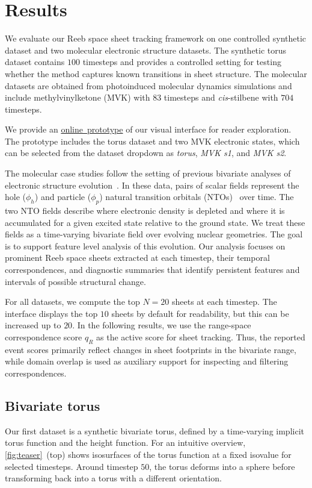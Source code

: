\documentclass[review]{vgtc}                          %
\begin{document}
\section{Results}

We evaluate our Reeb space sheet tracking framework on one controlled synthetic dataset and two molecular electronic structure datasets. The synthetic torus dataset contains $100$ timesteps and provides a controlled setting for testing whether the method captures known transitions in sheet structure. The molecular datasets are obtained from photoinduced molecular dynamics simulations and include methylvinylketone (MVK) with $83$ timesteps and \textit{cis}-stilbene with $704$ timesteps.

We provide an \mbox{\href{https://reebflowvisualizer.github.io}{online prototype}} of our visual interface for reader exploration. The prototype includes the torus dataset and two MVK electronic states, which can be selected from the dataset dropdown as \emph{torus}, \emph{MVK s1}, and \emph{MVK s2}.

The molecular case studies follow the setting of previous bivariate analyses of electronic structure evolution~\cite{Sharma2025}. In these data, pairs of scalar fields represent the hole ($\phi_h$) and particle ($\phi_p$) natural transition orbitals (NTOs)~\cite{martin_nto_2023} over time. The two NTO fields describe where electronic density is depleted and where it is accumulated for a given excited state relative to the ground state. We treat these fields as a time-varying bivariate field over evolving nuclear geometries. The goal is to support feature level analysis of this evolution. Our analysis focuses on prominent Reeb space sheets extracted at each timestep, their temporal correspondences, and diagnostic summaries that identify persistent features and intervals of possible structural change.

For all datasets, we compute the top $N=20$ sheets at each timestep. The interface displays the top $10$ sheets by default for readability, but this can be increased up to $20$. In the following results, we use the range-space correspondence score $q_R$ as the active score for sheet tracking. Thus, the reported event scores primarily reflect changes in sheet footprints in the bivariate range, while domain overlap is used as auxiliary support for inspecting and filtering correspondences.

\subsection{Bivariate torus}
Our first dataset is a synthetic bivariate torus, defined by a time-varying implicit torus function and the height function. For an intuitive overview, \mbox{\autoref{fig:teaser}~(top)} shows isosurfaces of the torus function at a fixed isovalue for selected timesteps. Around timestep $50$, the torus deforms into a sphere before transforming back into a torus with a different orientation.
\end{document}
